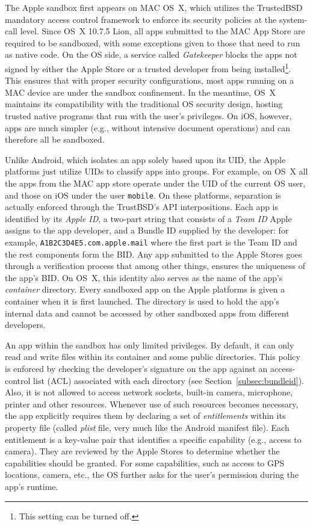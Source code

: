 \documentclass{article}
\newcommand{\ignore}[1]{}
\begin{document}
The Apple sandbox first appears on MAC OS~X, which utilizes the TrustedBSD mandatory access control framework to enforce its security policies at the system-call level. Since OS~X 10.7.5 Lion, all apps submitted to the MAC App Store are required to be sandboxed, with some exceptions given to those that need to run as native code. On the OS side, a service called \textit{Gatekeeper} blocks the apps not signed by either the Apple Store or a trusted developer from being installed\footnote{\small This setting can be turned off.}.  This ensures that with proper security configurations, most apps running on a MAC device are under the sandbox confinement. In the meantime, OS~X maintains its compatibility with the traditional OS security design, hosting trusted native programs that run with the user's privileges.\ignore{ The approach is necessary for accommodating the desktop applications with complicated functionalities.} On iOS, however, apps are much simpler (e.g., without intensive document operations) and can therefore all be sandboxed.

Unlike Android, which isolates an app solely based upon its UID, the Apple platforms just utilize UIDs to classify apps into groups. For example, on OS~X all the apps from the MAC app store operate under\ignore{are given} the UID of the current OS user, and those on iOS \ignore{all operate} under the user \texttt{mobile}. On these platforms, separation is actually enforced through the TrustBSD's API interpositions. Each app is identified by its \textit{Apple ID}, a two-part string that consists of a \textit{Team ID} Apple assigns to the app developer, and a Bundle ID supplied by the developer: for example, \texttt{A1B2C3D4E5.com.apple.mail} where the first part is the Team ID and the rest components form the BID. Any app submitted to the Apple Stores goes through a verification process that among other things, ensures the uniqueness of the app's BID. On OS~X, this identity also serves as the name of the app's \textit{container} directory. Every sandboxed app on the Apple platforms is given a container when it is first launched. The directory is used to hold the app's internal data and cannot be accessed by other sandboxed apps from different developers.

An app within the sandbox has only limited privileges. By default, it can only read and write files within its container and some public directories. This policy is enforced by checking the developer's signature on the app against an access-control list (ACL) associated with each directory (see Section~\ref{subsec:bundleid}).  Also, it is not allowed to access network sockets, built-in camera, microphone, printer and other resources. Whenever use of such resources becomes necessary, the app explicitly requires them by declaring a set of \textit{entitlements} within its property file (called \textit{plist} file, very much like the Android manifest file). Each entitlement is a key-value pair that identifies a specific capability (e.g., access to camera). They are reviewed by the Apple Stores to determine whether the capabilities should be granted. For some capabilities, such as access to GPS locations, camera, etc., the OS further asks for the user's permission during the app's runtime.
\end{document}
